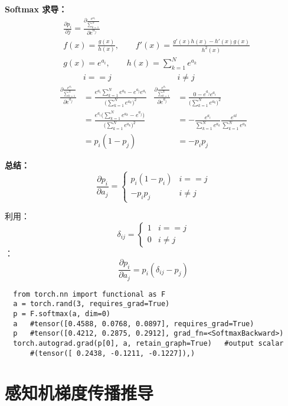 \noindent\textbf{Softmax 求导：}
\begin{align*}
  &\frac{\partial p_i}{\partial j}=\frac{\partial\frac{e^{a_i}}{\sum_{k=1}^{N}}}{\partial e^{a_j}}\\
  &f(x) = \frac{g(x)}{h(x)},~~~~~~~~~f'(x)=\frac{g'(x)h(x)-h'(x)g(x)}{h^2(x)}\\
  &g(x)=e^{a_i},~~~~~~~~~h(x)=\sum_{k=1}^{N}e^{a_k}
\end{align*}
\begin{align*}
  &i==j&&i\neq j\\
  \frac{\partial\frac{e^{a_i}}{\sum_{k=1}^{N}}}{\partial e^{a_j}}&=\frac{e^{a_i} \sum_{k=1}^{N} e^{a_k}-e^{a_j}e^{a_i}}{\big(\sum_{k=1}^{N}e^{a_k}\big)^2}&\frac{\partial\frac{e^{a_i}}{\sum_{k=1}^{N}}}{\partial e^{a_j}}&=\frac{0-e^{a_j}e^{a_i}}{\big(\sum_{k=1}^{N}e^{a_k}\big)^2}\\
  &=\frac{e^{a_i}\big(\sum_{k=1}^{N}e^{a_k}-e^{a_j}\big)}{\big(\sum_{k=1}^{N}e^{a_k}\big)^2}&&=-\frac{e^{a_i}}{\sum_{k=1}^{N}e^{a_k}}\frac{e^{a^j}}{\sum_{k=1}^{N}e^{a_k}}\\
  &=p_i(1-p_j)&&=-p_ip_j
\end{align*}

\textbf{总结：}\\
\begin{equation}\nonumber
\frac{\partial p_i}{\partial a_j}=
\begin{cases}
p_i(1-p_i)& i==j\\
-p_ip_j& i\neq j
\end{cases}
\end{equation}

利用：
\begin{equation}\nonumber
\delta_{ij}=
\begin{cases}
1& i==j\\
0& i\neq j
\end{cases}
\end{equation}
：
$$\frac{\partial p_i}{\partial a_j}=p_i(\delta_{ij}-p_j)$$
\begin{lstlisting}
  from torch.nn import functional as F
  a = torch.rand(3, requires_grad=True)
  p = F.softmax(a, dim=0)
  a   #tensor([0.4588, 0.0768, 0.0897], requires_grad=True)
  p   #tensor([0.4212, 0.2875, 0.2912], grad_fn=<SoftmaxBackward>)
  torch.autograd.grad(p[0], a, retain_graph=True)   #output scalar
      #(tensor([ 0.2438, -0.1211, -0.1227]),)
\end{lstlisting}


\newpage
\section{感知机梯度传播推导}
